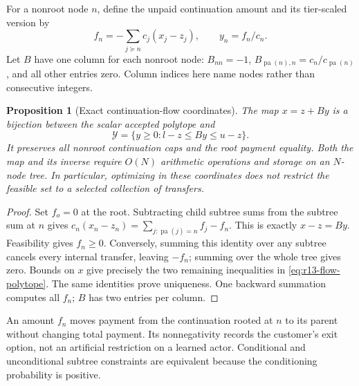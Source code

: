 \documentclass[11pt,letterpaper]{article}
\newtheorem{proposition}[theorem]{Proposition}
\theoremstyle{definition}
\newcommand{\1}{\mathbf 1}
\begin{document}
For a nonroot node $n$, define the unpaid continuation amount and its tier-scaled version by
\[
 f_n=-\sum_{j\succeq n}c_j(x_j-z_j),\qquad y_n=f_n/c_n.
\]
Let $B$ have one column for each nonroot node: $B_{nn}=-1$, $B_{\operatorname{pa}(n),n}=c_n/c_{\operatorname{pa}(n)}$, and all other entries zero. Column indices here name nodes rather than consecutive integers.
\begin{proposition}[Exact continuation-flow coordinates]\label{prop:r13-flow}
The map $x=z+By$ is a bijection between the scalar accepted polytope and
\begin{equation}\label{eq:r13-flow-polytope}
 \mathcal Y=\{y\geq0:l-z\leq By\leq u-z\}.
\end{equation}
It preserves all nonroot continuation caps and the root payment equality. Both the map and its inverse require $O(N)$ arithmetic operations and storage on an $N$-node tree. In particular, optimizing in these coordinates does not restrict the feasible set to a selected collection of transfers.
\end{proposition}
\begin{proof}
Set $f_o=0$ at the root. Subtracting child subtree sums from the subtree sum at $n$ gives
$c_n(x_n-z_n)=\sum_{j:\operatorname{pa}(j)=n}f_j-f_n$.
This is exactly $x-z=By$. Feasibility gives $f_n\geq0$. Conversely, summing this identity over any subtree cancels every internal transfer, leaving $-f_n$; summing over the whole tree gives zero. Bounds on $x$ give precisely the two remaining inequalities in \eqref{eq:r13-flow-polytope}. The same identities prove uniqueness. One backward summation computes all $f_n$; $B$ has two entries per column.
\end{proof}
An amount $f_n$ moves payment from the continuation rooted at $n$ to its parent without changing total payment. Its nonnegativity records the customer's exit option, not an artificial restriction on a learned actor. Conditional and unconditional subtree constraints are equivalent because the conditioning probability is positive.
\end{document}
